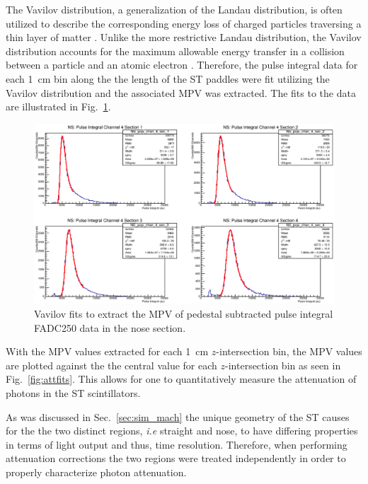The Vavilov distribution, a generalization of the Landau distribution, is often utilized to describe the corresponding energy loss of charged particles traversing a thin layer of matter \cite{seltzer_1964}.  Unlike the more restrictive Landau distribution, the Vavilov distribution accounts for the maximum allowable energy transfer in a collision between a particle and an atomic electron \cite{schorr_1973}.  Therefore, the pulse integral data for each 1~cm bin along the the length of the ST paddles were fit utilizing the Vavilov distribution and the associated MPV was extracted.  The fits to the data are illustrated in Fig.~\ref{fig:pisecnosefits}.
	\begin{figure}
		\centering
		\includegraphics[width=1.0\columnwidth]{calibration/figs/pi_sec_nose_fits}
		\caption{Vavilov fits to extract the MPV of pedestal subtracted pulse integral FADC250 data in the nose section.}
		\label{fig:pisecnosefits}
	\end{figure}
With the MPV values extracted for each 1~cm $z$-intersection bin, the MPV values are plotted against the the central value for each $z$-intersection bin as seen in Fig.~\ref{fig:attfits}.  This allows for one to quantitatively measure the attenuation of photons in the ST scintillators.

As was discussed in Sec.~\ref{sec:sim_mach} the unique geometry of the ST causes for the the two distinct regions, \textit{i.e} straight and nose, to have differing properties in terms of light output and thus, time resolution.  Therefore, when performing attenuation corrections the two regions were treated independently in order to properly characterize photon attenuation.  


